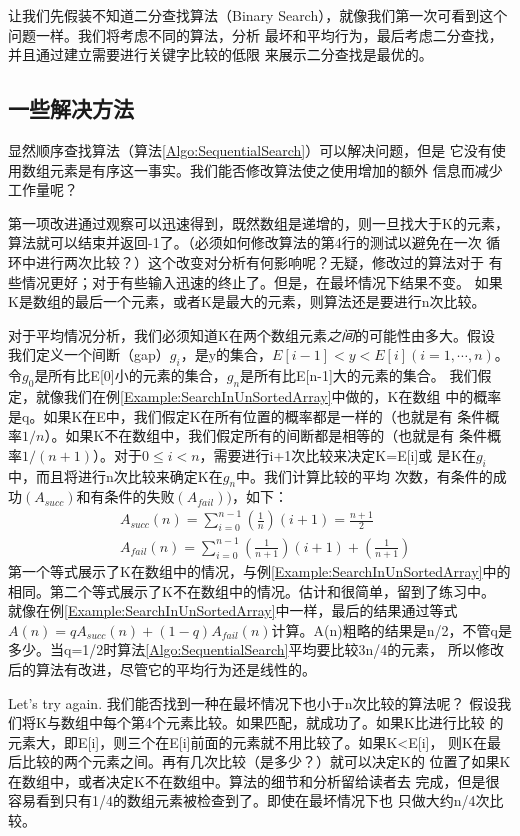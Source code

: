 让我们先假装不知道二分查找算法（Binary
Search），就像我们第一次可看到这个问题一样。我们将考虑不同的算法，分析
最坏和平均行为，最后考虑二分查找，并且通过建立需要进行关键字比较的低限
来展示二分查找是最优的。

\subsection{一些解决方法}
显然顺序查找算法（算法\ref{Algo:SequentialSearch}）可以解决问题，但是
它没有使用数组元素是有序这一事实。我们能否修改算法使之使用增加的额外
信息而减少工作量呢？

第一项改进通过观察可以迅速得到，既然数组是递增的，则一旦找大于K的元素，
算法就可以结束并返回-1了。（必须如何修改算法的第4行的测试以避免在一次
循环中进行两次比较？）这个改变对分析有何影响呢？无疑，修改过的算法对于
有些情况更好；对于有些输入迅速的终止了。但是，在最坏情况下结果不变。
如果K是数组的最后一个元素，或者K是最大的元素，则算法还是要进行n次比较。

对于平均情况分析，我们必须知道K在两个数组元素\emph{之间}的可能性由多大。假设
我们定义一个间断（gap）$g_i$，是y的集合，$E[i-1]<y<E[i](i= 1, \cdots,n)$。
令$g_0$是所有比E[0]小的元素的集合，$g_n$是所有比E[n-1]大的元素的集合。
我们假定，就像我们在例\ref{Example:SearchInUnSortedArray}中做的，K在数组
中的概率是q。如果K在E中，我们假定K在所有位置的概率都是一样的（也就是有
条件概率$1/n$）。如果K不在数组中，我们假定所有的间断都是相等的（也就是有
条件概率$1/(n+1)$）。对于$0\leq i <n$，需要进行i+1次比较来决定K=E[i]或
是K在$g_i$中，而且将进行n次比较来确定K在$g_n$中。我们计算比较的平均
次数，有条件的成功$(A_{succ})$和有条件的失败$(A_{fail}))$，如下：
\begin{displaymath}
\begin{aligned}
&A_{succ}(n)=\sum_{i=0}^{n-1}\left(\frac{1}{n}\right)(i+1)=\frac{n+1}{2}\\
&A_{fail}(n)=\sum_{i=0}^{n-1}\left(\frac{1}{n+1}\right)(i+1)+\left(\frac{1}{n+1}\right)
\end{aligned}
\end{displaymath}
\noindent
第一个等式展示了K在数组中的情况，与例\ref{Example:SearchInUnSortedArray}中的
相同。第二个等式展示了K不在数组中的情况。估计和很简单，留到了练习中。
就像在例\ref{Example:SearchInUnSortedArray}中一样，最后的结果通过等式
$A(n)=qA_{succ}(n)+(1-q)A_{fail}(n)$计算。A(n)粗略的结果是n/2，不管q是
多少。当q=1/2时算法\ref{Algo:SequentialSearch}平均要比较3n/4的元素，
所以修改后的算法有改进，尽管它的平均行为还是线性的。

Let's try again. 我们能否找到一种在最坏情况下也小于n次比较的算法呢？
假设我们将K与数组中每个第4个元素比较。如果匹配，就成功了。如果K比进行比较
的元素大，即E[i]，则三个在E[i]前面的元素就不用比较了。如果K<E[i]，
则K在最后比较的两个元素之间。再有几次比较（是多少？）就可以决定K的
位置了如果K在数组中，或者决定K不在数组中。算法的细节和分析留给读者去
完成，但是很容易看到只有1/4的数组元素被检查到了。即使在最坏情况下也
只做大约n/4次比较。

